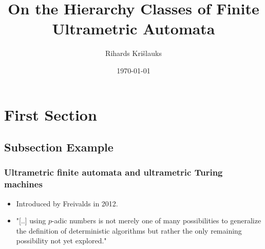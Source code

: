 \documentclass{beamer}
\title{On the Hierarchy Classes of Finite Ultrametric Automata} %
\author{Rihards Kri\v{s}lauks} %
\institute[LU] %
{
University of Latvia Faculty of Computing \\ %
}
\date{\today} %
\begin{document}
\begin{frame}
\titlepage %
\end{frame}

\section{First Section} %

\subsection{Subsection Example} %

\begin{frame}
\frametitle{Ultrametric finite automata and ultrametric Turing machines}
\begin{itemize}
	\item Introduced by Freivalds in 2012.
	\item "[..] using $p$-adic numbers is not merely one of many possibilities to generalize the definition of deterministic algorithms but rather the only remaining possibility not yet explored."
\end{itemize}
\end{frame}
\end{document}
